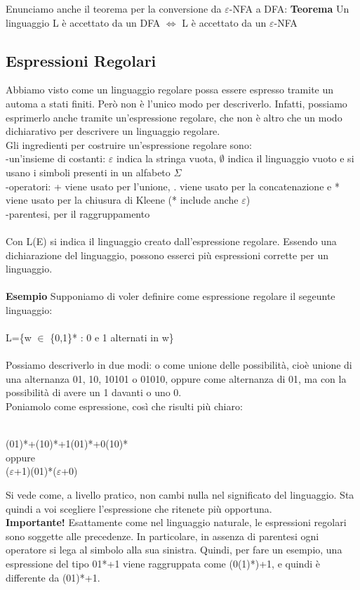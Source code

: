 \documentclass[]{article}
\begin{document}
				Enunciamo anche il teorema per la conversione da $\varepsilon$-NFA a DFA:
				\newline
				\newline
				\textbf{Teorema}\newline
				Un linguaggio L è accettato da un DFA $\Leftrightarrow$ L è accettato da un $\varepsilon$-NFA
		\subsection{Espressioni Regolari}
			Abbiamo visto come un linguaggio regolare possa essere espresso tramite un automa a stati finiti. Però non è l'unico modo per descriverlo. Infatti, possiamo esprimerlo anche tramite un'espressione regolare, che non è altro che un modo dichiarativo per descrivere un linguaggio regolare.\\
			Gli ingredienti per costruire un'espressione regolare sono:\\
			-un'insieme di costanti: $\varepsilon$ indica la stringa vuota, $\emptyset$ indica il linguaggio vuoto e si usano i simboli presenti in un alfabeto $\Sigma$\\
			-operatori: + viene usato per l'unione, . viene usato per la concatenazione e * viene usato per la chiusura di Kleene (* include anche $\varepsilon$)\\
			-parentesi, per il raggruppamento\\\\
			Con L(E) si indica il linguaggio creato dall'espressione regolare. Essendo una dichiarazione del linguaggio, possono esserci più espressioni corrette per un linguaggio.\\\\
			\textbf{Esempio} Supponiamo di voler definire come espressione regolare il segeunte linguaggio:\\\\
			L=\{w $\in$ \{0,1\}* : 0 e 1 alternati in w\}\\\\
			Possiamo descriverlo in due modi: o come unione delle possibilità, cioè unione di una alternanza 01, 10, 10101 o 01010, oppure come alternanza di 01, ma con la possibilità di avere un 1 davanti o uno 0.\\
			Poniamolo come espressione, così che risulti più chiaro:\\\\
			\begin{center}
				(01)*+(10)*+1(01)*+0(10)*\\oppure\\ ($\varepsilon$+1)(01)*($\varepsilon$+0)
			\end{center}
			Si vede come, a livello pratico, non cambi nulla nel significato del linguaggio. Sta quindi a voi scegliere l'espressione che ritenete più opportuna.\\
			\textbf{Importante!} Esattamente come nel linguaggio naturale, le espressioni regolari sono soggette alle precedenze. In particolare, in assenza di parentesi ogni operatore si lega al simbolo alla sua sinistra. Quindi, per fare un esempio, una espressione del tipo 01*+1 viene raggruppata come (0(1)*)+1, e quindi è differente da (01)*+1.
\end{document}
